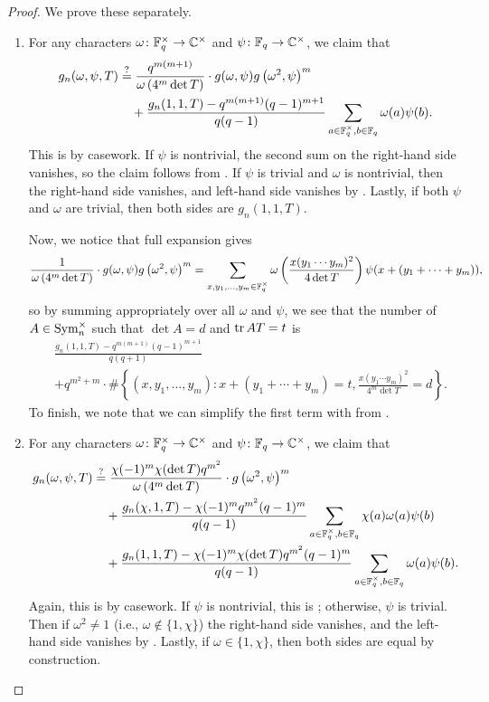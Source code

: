\begin{proof}
    We prove these separately.
    \begin{enumerate}[label=(\alph*)]
        \item For any characters $\omega\colon\mathbb F_q^\times\to\mathbb C^\times$ and $\psi\colon\mathbb F_q\to\mathbb C^\times$, we claim that
        \begin{align*}
            g_n(\omega,\psi,T) &\stackrel?= \frac{q^{m(m+1)}}{\omega\left(4^m\det T\right)}\cdot g(\omega,\psi)g\left(\omega^2,\psi\right)^m \\
            &\quad+\frac{g_n(1,1,T)-q^{m(m+1)}(q-1)^{m+1}}{q(q-1)}\sum_{a\in\mathbb F_q^\times,b\in\mathbb F_q}\omega(a)\psi(b).
        \end{align*}
        This is by casework. If $\psi$ is nontrivial, the second sum on the right-hand side vanishes, so the claim follows from . If $\psi$ is trivial and $\omega$ is nontrivial, then the right-hand side vanishes, and left-hand side vanishes by . Lastly, if both $\psi$ and $\omega$ are trivial, then both sides are $g_n(1,1,T)$.

        Now, we notice that full expansion gives
        \[\frac1{\omega\left(4^m\det T\right)}\cdot g(\omega,\psi)g\left(\omega^2,\psi\right)^m=\sum_{x,y_1,\ldots,y_m\in\mathbb F_q^\times}\omega\left(\frac{x(y_1\cdots y_m)^2}{4\det T}\right)\psi(x+(y_1+\cdots+y_m)),\]
        so by summing appropriately over all $\omega$ and $\psi$, we see that the number of $A\in\operatorname{Sym}_n^\times$ such that $\det A=d$ and $\operatorname{tr} AT=t$ is
        \begin{align*}
            &\frac{g_n(1,1,T)-q^{m(m+1)}(q-1)^{m+1}}{q(q+1)} \\
            &+q^{m^2+m}\cdot\#\left\{(x,y_1,\ldots,y_m):x+(y_1+\cdots+y_m)=t,\frac{x(y_1\cdots y_m)^2}{4^m\det T}=d\right\}.
        \end{align*}
        To finish, we note that we can simplify the first term with from .

        \item For any characters $\omega\colon\mathbb F_q^\times\to\mathbb C^\times$ and $\psi\colon\mathbb F_q\to\mathbb C^\times$, we claim that
        \begin{align*}
            g_n(\omega,\psi,T) &\stackrel?= \frac{\chi(-1)^m\chi(\det T)q^{m^2}}{\omega\left(4^m\det T\right)}\cdot g\left(\omega^2,\psi\right)^m \\
            &\quad+\frac{g_n(\chi,1,T)-\chi(-1)^mq^{m^2}(q-1)^m}{q(q-1)}\sum_{a\in\mathbb F_q^\times,b\in\mathbb F_q}\chi(a)\omega(a)\psi(b) \\
            &\quad+\frac{g_n(1,1,T)-\chi(-1)^m\chi(\det T)q^{m^2}(q-1)^m}{q(q-1)}\sum_{a\in\mathbb F_q^\times,b\in\mathbb F_q}\omega(a)\psi(b).
        \end{align*}
        Again, this is by casework. If $\psi$ is nontrivial, this is ; otherwise, $\psi$ is trivial. Then if $\omega^2\ne1$ (i.e., $\omega\notin\{1,\chi\}$) the right-hand side vanishes, and the left-hand side vanishes by . Lastly, if $\omega\in\{1,\chi\}$, then both sides are equal by construction.


\end{enumerate}
\end{proof}
